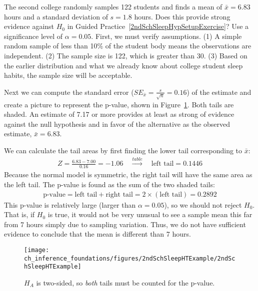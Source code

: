 \begin{example}{The second college randomly samples 122 students and finds a mean of $\bar{x} = 6.83$ hours and a standard deviation of $s=1.8$ hours. Does this provide strong evidence against $H_0$ in Guided Practice~\ref{2ndSchSleepHypSetupExercise}? Use a significance level of $\alpha=0.05$.}
First, we must verify assumptions. (1) A simple random sample of less than 10\% of the student body means the observations are independent. (2) The sample size is 122, which is greater than 30. (3) Based on the earlier distribution and what we already know about college student sleep habits, the sample size will be acceptable.

Next we can compute the standard error ($SE_{\bar{x}} = \frac{s}{\sqrt{n}} = 0.16$) of the estimate and create a picture to represent the p-value, shown in Figure~\ref{2ndSchSleepHTExample}. Both tails are shaded. An estimate of 7.17 or more provides at least as strong of evidence against the null hypothesis and in favor of the alternative as the observed estimate, $\bar{x} = 6.83$.

We can calculate the tail areas by first finding the lower tail corresponding to $\bar{x}$:
\begin{eqnarray*}
Z = \frac{6.83 - 7.00}{0.16} = -1.06 \quad\stackrel{table}{\rightarrow}\quad \text{left tail} = 0.1446
\end{eqnarray*}
Because the normal model is symmetric, the right tail will have the same area as the left tail. The p-value is found as the sum of the two shaded tails:
\begin{eqnarray*}
\text{p-value} = \text{left tail} + \text{right tail} = 2\times(\text{left tail}) = 0.2892
\end{eqnarray*}
This p-value is relatively large (larger than $\alpha=0.05$), so we should not reject $H_0$. That is, if $H_0$ is true, it would not be very unusual to see a sample mean this far from 7 hours simply due to sampling variation. Thus, we do not have sufficient evidence to conclude that the mean is different than 7 hours.


\begin{figure}
   \centering
   \texttt{[image: ch\_inference\_foundations/figures/2ndSchSleepHTExample/2ndSchSleepHTExample]}
   \caption{$H_A$ is two-sided, so \emph{both} tails must be counted for the p-value.}
   \label{2ndSchSleepHTExample}
\end{figure}

\end{example}

